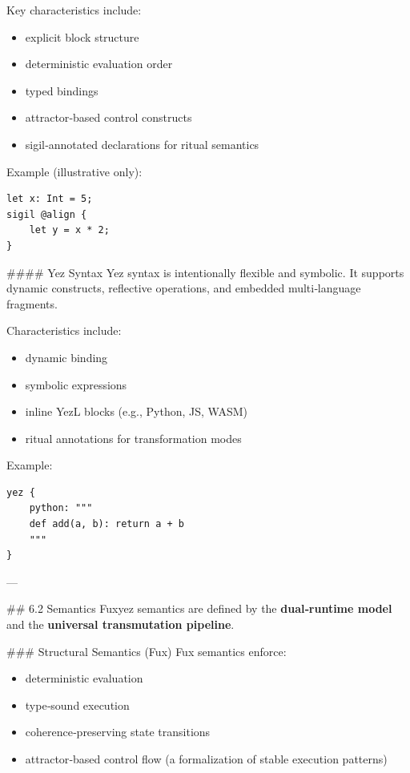 \documentclass[12pt, a4paper]{book}
\begin{document}
Key characteristics include:  
\begin{itemize}
  \item explicit block structure  
  \item deterministic evaluation order  
  \item typed bindings  
  \item attractor‑based control constructs  
  \item sigil‑annotated declarations for ritual semantics
\end{itemize}

Example (illustrative only):  
\begin{lstlisting}[language=fuxyez]
let x: Int = 5;
sigil @align {
    let y = x * 2;
}

\end{lstlisting}

\#\#\#\# Yez Syntax  
Yez syntax is intentionally flexible and symbolic. It supports dynamic constructs, reflective operations, and embedded multi‑language fragments.

Characteristics include:  
\begin{itemize}
  \item dynamic binding  
  \item symbolic expressions  
  \item inline YezL blocks (e.g., Python, JS, WASM)  
  \item ritual annotations for transformation modes
\end{itemize}

Example:  
\begin{lstlisting}[language=fuxyez]
yez {
    python: """
    def add(a, b): return a + b
    """
}

\end{lstlisting}

---

\#\# 6.2 Semantics  
Fuxyez semantics are defined by the \textbf{dual‑runtime model} and the \textbf{universal transmutation pipeline}.

\#\#\# Structural Semantics (Fux)  
Fux semantics enforce:  
\begin{itemize}
  \item deterministic evaluation  
  \item type‑sound execution  
  \item coherence‑preserving state transitions  
  \item attractor‑based control flow (a formalization of stable execution patterns)
\end{itemize}
\end{document}
